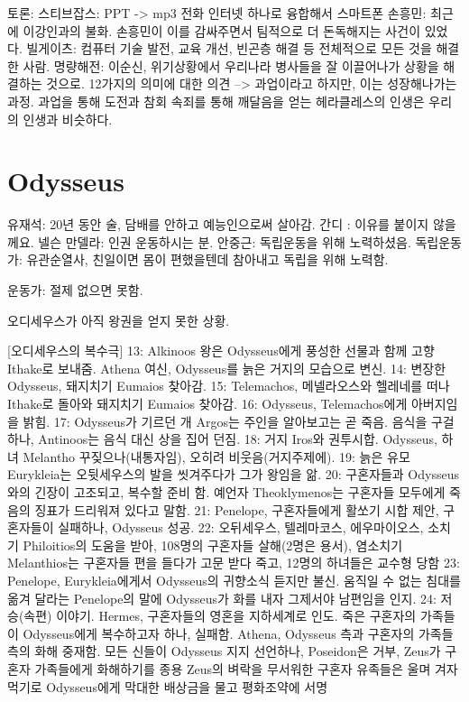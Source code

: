 토론:
스티브잡스: PPT -> mp3 전화 인터넷 하나로 융합해서 스마트폰
손흥민: 최근에 이강인과의 불화. 손흥민이 이를 감싸주면서 팀적으로 더 돈독해지는 사건이 있었다.
빌게이츠: 컴퓨터 기술 발전, 교육 개선, 빈곤층 해결 등 전체적으로 모든 것을 해결한 사람.
명량해전: 이순신, 위기상황에서 우리나라 병사들을 잘 이끌어나가 상황을 해결하는 것으로.
12가지의 의미에 대한 의견 --> 과업이라고 하지만, 이는 성장해나가는 과정. 과업을 통해 도전과 참회 속죄를 통해 깨달음을 얻는
헤라클레스의 인생은 우리의 인생과 비슷하다.

\section{Odysseus}

유재석: 20년 동안 술, 담배를 안하고 예능인으로써 살아감.
간디 : 이유를 붙이지 않을께요.
넬슨 만델라: 인권 운동하시는 분.
안중근:    독립운동을 위해 노력하셨음.
독립운동가: 유관순열사, 친일이면 몸이 편했을텐데 참아내고 독립을 위해 노력함.

운동가: 절제 없으면 못함.

오디세우스가 아직 왕권을 얻지 못한 상황.

[오디세우스의 복수극]
13: Alkinoos 왕은 Odysseus에게 풍성한 선물과 함께 고향 Ithake로 보내줌.
    Athena 여신, Odysseus를 늙은 거지의 모습으로 변신.
14: 변장한 Odysseus, 돼지치기 Eumaios 찾아감.
15: Telemachos, 메넬라오스와 헬레네를 떠나 Ithake로 돌아와 돼지치기 Eumaios 찾아감.
16: Odysseus, Telemachos에게 아버지임을 밝힘.
17: Odysseus가 기르던 개 Argos는 주인을 알아보고는 곧 죽음.
    음식을 구걸하나, Antinoos는 음식 대신 상을 집어 던짐. 
18: 거지 Iros와 권투시합. Odysseus, 하녀 Melantho 꾸짖으나(내통자임), 오히려 비웃음(거지주제에).
19: 늙은 유모 Eurykleia는 오뒷세우스의 발을 씻겨주다가 그가 왕임을 앎.
20: 구혼자들과 Odysseus와의 긴장이 고조되고, 복수할 준비 함.
    예언자 Theoklymenos는 구혼자들 모두에게 죽음의 징표가 드리워져 있다고 말함.
21: Penelope, 구혼자들에게 활쏘기 시합 제안, 구혼자들이 실패하나, Odysseus 성공.
22: 오뒤세우스, 텔레마코스, 에우마이오스, 소치기 Philoitios의 도움을 받아, 
    108명의 구혼자들 살해(2명은 용서), 염소치기 Melanthios는 구혼자들 편을 들다가 
    고문 받다 죽고, 12명의 하녀들은 교수형 당함
23: Penelope, Eurykleia에게서 Odysseus의 귀향소식 듣지만 불신. 
    움직일 수 없는 침대를 옮겨 달라는 Penelope의 말에 Odysseus가 화를 내자 그제서야 남편임을 인지.
24: 저승(속편) 이야기. Hermes, 구혼자들의 영혼을 지하세계로 인도.
    죽은 구혼자의 가족들이 Odysseus에게 복수하고자 하나, 실패함.   
    Athena, Odysseus 측과 구혼자의 가족들 측의 화해 중재함.
    모든 신들이 Odysseus 지지 선언하나, Poseidon은 거부, Zeus가 구혼자 가족들에게 화해하기를 종용
    Zeus의 벼락을 무서워한 구혼자 유족들은 
    울며 겨자 먹기로 Odysseus에게 막대한 배상금을 물고 평화조약에 서명

